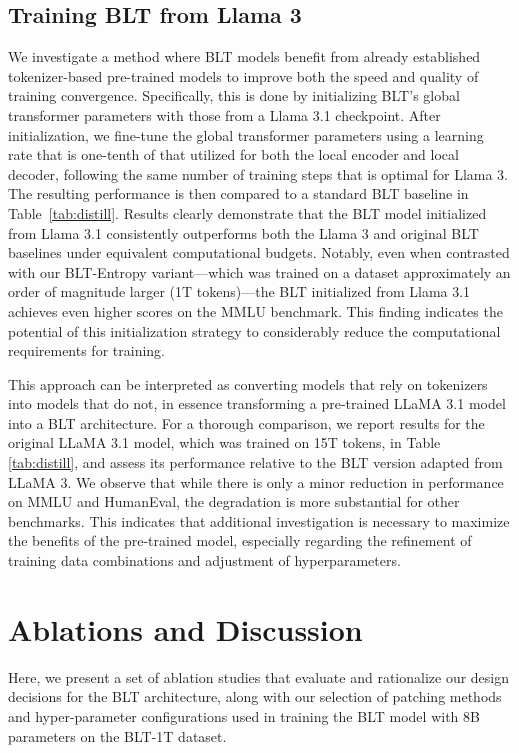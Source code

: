 \subsection{Training {\textsc BLT} from Llama 3}
\label{sec:distillation}
We investigate a method where {\textsc BLT} models benefit from already established tokenizer-based pre-trained models to improve both the speed and quality of training convergence. Specifically, this is done by initializing {\textsc BLT}'s global transformer parameters with those from a Llama 3.1 checkpoint. After initialization, we fine-tune the global transformer parameters using a learning rate that is one-tenth of that utilized for both the local encoder and local decoder, following the same number of training steps that is optimal for Llama 3. The resulting performance is then compared to a standard {\textsc BLT} baseline in Table~\ref{tab:distill}. Results clearly demonstrate that the {\textsc BLT} model initialized from Llama 3.1 consistently outperforms both the Llama 3 and original {\textsc BLT} baselines under equivalent computational budgets. Notably, even when contrasted with our {\textsc BLT}-Entropy variant—which was trained on a dataset approximately an order of magnitude larger (1T tokens)—the {\textsc BLT} initialized from Llama 3.1 achieves even higher scores on the MMLU benchmark. This finding indicates the potential of this initialization strategy to considerably reduce the computational requirements for training.

This approach can be interpreted as converting models that rely on tokenizers into models that do not, in essence transforming a pre-trained LLaMA 3.1 model into a {\textsc BLT} architecture. For a thorough comparison, we report results for the original LLaMA 3.1 model, which was trained on 15T tokens, in Table \ref{tab:distill}, and assess its performance relative to the {\textsc BLT} version adapted from LLaMA 3. We observe that while there is only a minor reduction in performance on MMLU and HumanEval, the degradation is more substantial for other benchmarks. This indicates that additional investigation is necessary to maximize the benefits of the pre-trained model, especially regarding the refinement of training data combinations and adjustment of hyperparameters.

\section{Ablations and Discussion}
\label{section:ablations}
Here, we present a set of ablation studies that evaluate and rationalize our design decisions for the {\textsc BLT} architecture, along with our selection of patching methods and hyper-parameter configurations used in training the {\textsc BLT} model with 8B parameters on the {\textsc BLT}-1T dataset.

